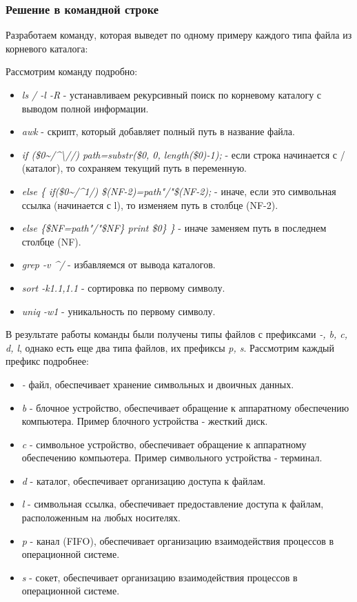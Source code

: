 \documentclass[14pt,a4paper,report]{report}
\begin{document}
\subsubsection{Решение в командной строке}

Разработаем команду, которая выведет по одному примеру каждого типа файла из корневого каталога:



Рассмотрим команду подробно:

\begin{itemize}
	\item \emph{ls / -l -R} - устанавливаем рекурсивный поиск по корневому каталогу с выводом полной информации.
	\item \emph{awk} - скрипт, который добавляет полный путь в название файла.
	\item \emph{if (\$0\textasciitilde/\textasciicircum\textbackslash//) path=substr(\$0, 0, length(\$0)-1); } - если строка начинается с / (каталог), то сохраняем текущий путь в переменную.
	\item \emph{else \{ if(\$0\textasciitilde/\textasciicircum1/) \$(NF-2)=path"/"\$(NF-2);} - иначе, если это символьная ссылка (начинается с l), то изменяем путь в столбце (NF-2).
	\item \emph{else \{\$NF=path"/"\$NF\} print \$0\} \} } - иначе заменяем путь в последнем столбце (NF).
	\item \emph{grep -v \textasciicircum/} - избавляемся от вывода каталогов.
	\item \emph{sort -k1.1,1.1} - сортировка по первому символу.
	\item \emph{uniq -w1} - уникальность по первому символу.
\end{itemize}

\clearpage

В результате работы команды были получены типы файлов с префиксами \emph{-, b, c, d, l}, однако есть еще два типа файлов, их префиксы \emph{p, s}. Рассмотрим каждый префикс подробнее:

\begin{itemize}
	\item \emph{-} файл, обеспечивает хранение символьных и двоичных данных.
	\item \emph{b} - блочное устройство, обеспечивает обращение к аппаратному обеспечению компьютера. Пример блочного устройства - жесткий диск.
	\item \emph{c} - символьное устройство, обеспечивает обращение к аппаратному обеспечению компьютера. Пример символьного устройства - терминал.
	\item \emph{d} - каталог, обеспечивает организацию доступа к файлам.
	\item \emph{l} - символьная ссылка, обеспечивает предоставление доступа к файлам, расположенным на любых носителях.
	\item \emph{p} - канал (FIFO), обеспечивает организацию взаимодействия процессов в операционной системе.
	\item \emph{s} - сокет, обеспечивает организацию взаимодействия процессов в операционной системе.
\end{itemize}
\end{document}
